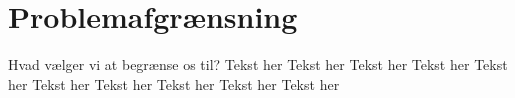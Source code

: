 \section{Problemafgrænsning}
Hvad vælger vi at begrænse os til? Tekst her Tekst her Tekst her Tekst her Tekst her Tekst her Tekst her Tekst her Tekst her Tekst her 